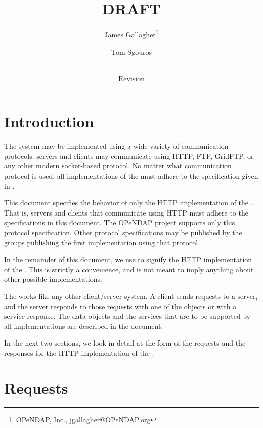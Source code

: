 \documentclass[justify]{dods-paper}
\title{\DAPHTTPTitle\\ DRAFT}
\author{James Gallagher\thanks{OPeNDAP, Inc., jgallagher@OPeNDAP.org}
\and Tom Sgouros}
\date{\rcsInfoDate \\ Revision \rcsInfoRevision}
\begin{document}
\maketitle
\T\tableofcontents

\section{Introduction}


The \opendap system may be implemented using a wide variety of
communication protocols. \DAP servers and clients may communicate
using HTTP, FTP, GridFTP, or any other modern socket-based protocol.
No matter what communication protocol is used, all implementations of
the \DAP must adhere to the specification given in \DAPObjects.

This document specifies the behavior of only the HTTP implementation
of the \DAP. That is, \DAP servers and clients that communicate using
HTTP must adhere to the specifications in this document. The OPeNDAP
project supports only this protocol specification. Other protocol
specifications may be published by the groups publishing the first
implementation using that protocol.

In the remainder of this document, we use \DAP to signify the HTTP
implementation of the \DAP. This is strictly a convenience, and is not
meant to imply anything about other possible implementations.

The \DAP works like any other client/server system.  A client sends
requests to a server, and the server responds to those requests with
one of the \DAP objects or with a service response.  The data objects
and the services that are to be supported by all \DAP implementations
are described in the \DAPObjects document.

In the next two sections, we look in detail at the form of
the requests and the responses for the HTTP implementation of the
\DAP. 

\section{Requests}
\label{sec-requests}
\end{document}
